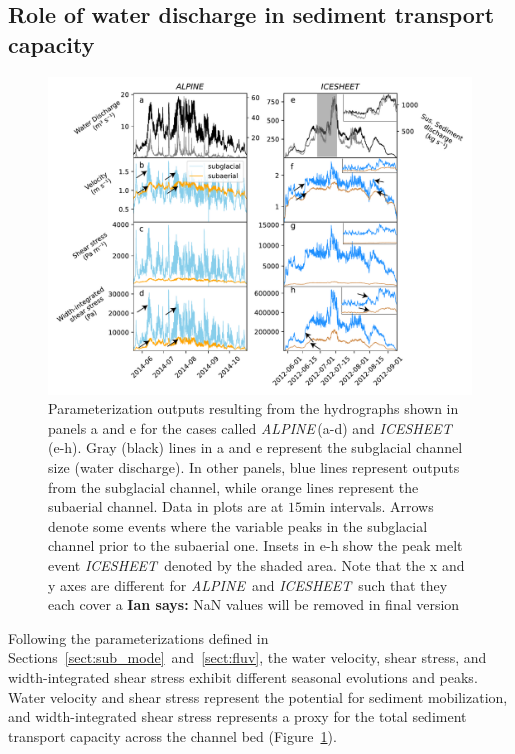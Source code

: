 \documentclass[11pt]{article}
\newcommand{\ian}[1]{{\textbf{\color{blue}Ian says:} \color{blue} #1} }
\newcommand{\alpine}{\textit{ALPINE}\,}
\newcommand{\icesheet}{\textit{ICESHEET}\,}
\newcommand{\unit}[1]{$\mathrm{#1}$}
\begin{document}
\subsection{Role of water discharge in sediment transport capacity}
\begin{figure}[h]
  \centering
  \includegraphics[width=0.9\linewidth]{Fig2.pdf}
  \caption{Parameterization outputs resulting from the hydrographs shown in panels a and e for the cases called \alpine (a-d) and \icesheet{} (e-h). Gray (black) lines in a and e represent the subglacial channel size (water discharge).  In other panels, blue lines represent outputs from the subglacial channel, while orange lines represent the subaerial channel.
    Data in plots are at $15$\unit{min} intervals.
    Arrows denote some events where the variable peaks in the subglacial channel prior to the subaerial one.
    Insets in e-h show the  peak melt event \icesheet{} denoted by the shaded area.
    Note that the x and y axes are different for \alpine{} and \icesheet{} such that they each cover a 
        \ian{NaN values will be removed in final version}
      }
  \label{fig:model_outs}
\end{figure}
Following the parameterizations defined in Sections~\ref{sect:sub_mode}~and~\ref{sect:fluv}, the water velocity, shear stress, and width-integrated shear stress exhibit different seasonal evolutions and peaks. Water velocity and shear stress represent the potential for sediment mobilization, and width-integrated shear stress represents a proxy for the total sediment transport capacity across the channel bed (Figure~\ref{fig:model_outs}).
\end{document}

